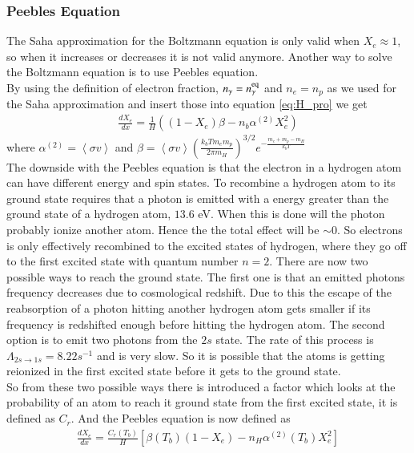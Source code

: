 \documentclass{aa}
\begin{document}
\subsubsection{Peebles Equation}
The Saha approximation for the Boltzmann equation is only valid when $X_e\approx1$, so when it increases or decreases it is not valid anymore. Another way to solve the Boltzmann equation is to use Peebles equation.  \\
By using the definition of electron fraction, $n_\gamma = n_\gamma^{\rm eq}$ and $n_e=n_p$ as we used for the Saha approximation and insert those into equation \eqref{eq:H_pro} we get \begin{align}
    \frac{dX_e}{dx} = \frac{1}{H}  \left((1 - X_e) \beta - n_b \alpha^{(2)} X_e^2\right)
\end{align}
where $\alpha^{(2)} = \left<\sigma v\right>$ and $\beta = \left<\sigma v\right>\left(\frac{k_bT m_em_p}{2\pi m_H}\right)^{3/2} e^{-\frac{m_e + m_p - m_H}{k_bT}}$\\
The downside with the Peebles equation is that the electron in a hydrogen atom can have different energy and spin states. To recombine a hydrogen atom to its ground state requires that a photon is emitted with a energy greater than the ground state of a hydrogen atom, $13.6$ eV. When this is done will the photon probably ionize another atom. Hence the the total effect will be $\sim0$. So electrons is only effectively recombined to the excited states of hydrogen, where they go off to the first excited state with quantum number $n=2$. There are now two possible ways to reach the ground state. The first one is that an emitted photons frequency decreases due to cosmological redshift. Due to this the escape of the reabsorption of a photon hitting another hydrogen atom gets smaller if its frequency is redshifted enough before hitting the hydrogen atom. The second option is to emit two photons from the $2s$ state. The rate of this process is $\Lambda_{2s\to 1s} = 8.22 s^{-1}$ and is very slow. So it is possible that the atoms is getting reionized in the first excited state before it gets to the ground state.\\
So from these two possible ways there is introduced a factor which looks at the probability of an atom to reach it ground state from the first excited state, it is defined as $C_r$. And the Peebles equation is now defined as 
\begin{align}
    \frac{dX_e}{dx} = \frac{C_r(T_b)}{H} \left[\beta(T_b)(1-X_e) - n_H
\alpha^{(2)}(T_b)X_e^2\right] \label{eq:Peebles_eq_Cr}
\end{align}
\end{document}
